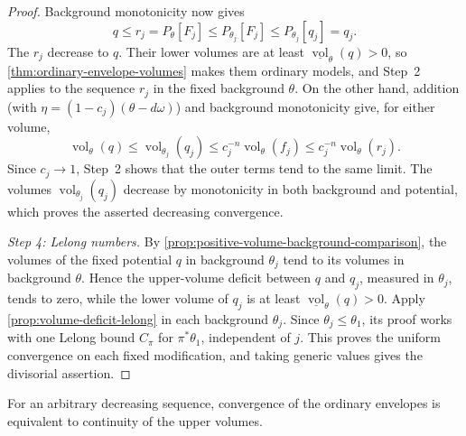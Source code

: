 \begin{proof}
Background monotonicity now gives
\[
 q\leq r_j=P_\theta[F_j]\leq P_{\theta_j}[F_j]
       \leq P_{\theta_j}[q_j]=q_j.
\]
The $r_j$ decrease to $q$. Their lower volumes are at least $\underline{\operatorname{vol}}_\theta(q)>0$, so \cref{thm:ordinary-envelope-volumes} makes them ordinary models, and Step~2 applies to the sequence $r_j$ in the fixed background $\theta$. On the other hand, addition (with $\eta=(1-c_j)(\theta-d\omega)$) and background monotonicity give, for either volume,
\[
 \operatorname{vol}_\theta(q)
 \leq\operatorname{vol}_{\theta_j}(q_j)
 \leq c_j^{-n}\operatorname{vol}_\theta(f_j)
 \leq c_j^{-n}\operatorname{vol}_\theta(r_j).
\]
Since $c_j\to1$, Step~2 shows that the outer terms tend to the same limit. The volumes $\operatorname{vol}_{\theta_j}(q_j)$ decrease by monotonicity in both background and potential, which proves the asserted decreasing convergence.

\emph{Step 4: Lelong numbers.} By \cref{prop:positive-volume-background-comparison}, the volumes of the fixed potential $q$ in background $\theta_j$ tend to its volumes in background $\theta$. Hence the upper-volume deficit between $q$ and $q_j$, measured in $\theta_j$, tends to zero, while the lower volume of $q_j$ is at least $\underline{\operatorname{vol}}_\theta(q)>0$. Apply \cref{prop:volume-deficit-lelong} in each background $\theta_j$. Since $\theta_j\leq\theta_1$, its proof works with one Lelong bound $C_\pi$ for $\pi^*\theta_1$, independent of $j$. This proves the uniform convergence on each fixed modification, and taking generic values gives the divisorial assertion.
\end{proof}

For an arbitrary decreasing sequence, convergence of the ordinary envelopes is equivalent to continuity of the upper volumes.

